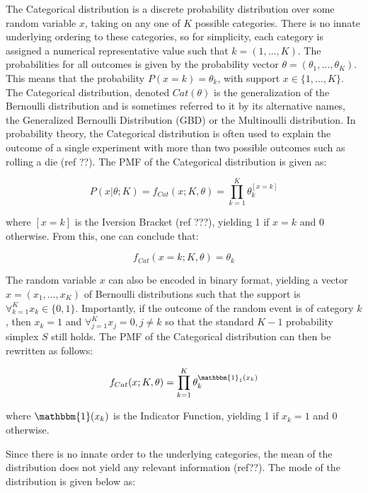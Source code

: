 The Categorical distribution is a discrete probability distribution over some random variable $x$, taking on any one of $K$ possible categories. There is no innate underlying ordering to these categories, so for simplicity, each category is assigned a numerical representative value such that $k = (1, \dots, K)$. The probabilities for all outcomes is given by the probability vector $\theta = (\theta_{1}, \dots, \theta_{K})$.  This means that the probability $P(x=k)=\theta_{k}$, with support $x \in \{1, \dots, K\}$. The Categorical distribution, denoted $Cat(\theta)$ is the generalization of the Bernoulli distribution and is sometimes referred to it by its alternative names, the Generalized Bernoulli Distribution (GBD) or the Multinoulli distribution. In probability theory, the Categorical distribution is often used to explain the outcome of a single experiment with more than two possible outcomes such as rolling a die (ref ??). The PMF of the Categorical distribution is given as:

\begin{equation}
P(x | \theta; K) = f_{Cat}(x; K, \theta) = \prod_{k=1}^{K}\theta_{k}^{[x = k]}
\end{equation}

where $[x = k]$ is the Iversion Bracket (ref ???), yielding 1 if $x = k$ and 0 otherwise. From this, one can conclude that:

\begin{equation}
f_{Cat}(x=k; K, \theta) = \theta_{k}
\end{equation}

The random variable $x$ can also be encoded in binary format, yielding a vector $x = (x_{1}, \dots, x_{K})$ of Bernoulli distributions such that the support is $\forall_{k=1}^{K} x_{k} \in \{0, 1\}$. Importantly, if the outcome of the random event is of category $k$, then $x_{k} = 1$ and $\forall_{j=1}^{K} x_{j} = 0, j \neq k$ so that the standard $K-1$ probability simplex $S$ still holds. The PMF of the Categorical distribution can then be rewritten as follows:

\begin{equation}
f_{Cat}(x; K, \theta) = \prod_{k=1}^{K}\theta_{k}^{\mathbbm{1}_{1}(x_{k})}
\end{equation}

where $\mathbbm{1}(x_{k})$ is the Indicator Function, yielding 1 if $x_{k} = 1$ and 0 otherwise.

Since there is no innate order to the underlying categories, the mean of the distribution does not yield any relevant information (ref??). The mode of the distribution is given below as:

